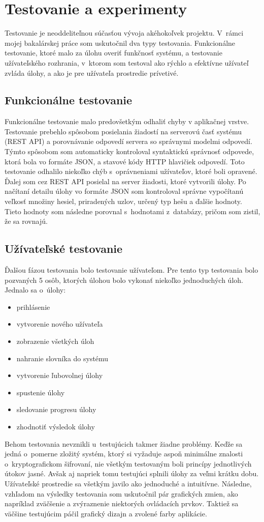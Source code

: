 \documentclass[slovak]{fitthesis}
\begin{document}
\chapter{Testovanie a experimenty}\label{testovanie}
Testovanie je neoddeliteľnou súčasťou vývoja akéhokoľvek projektu. V~rámci mojej bakalárskej práce som uskutočnil dva typy testovania. Funkcionálne testovanie, ktoré malo za úlohu overiť funkčnosť systému, a testovanie užívateľského rozhrania, v~ktorom som testoval ako rýchlo a efektívne užívateľ zvláda úlohy, a ako je pre užívateľa  prostredie prívetivé.

\section{Funkcionálne testovanie}
Funkcionálne testovanie malo predovšetkým odhaliť chyby v aplikačnej vrstve. Testovanie prebehlo spôsobom posielania žiadostí na serverovú časť systému (REST API) a porovnávanie odpovedí servera so správnymi modelmi odpovedí. Týmto spôsobom som automaticky kontroloval syntaktickú správnosť odpovede, ktorá bola vo formáte JSON, a stavové kódy HTTP hlavičiek odpovedí. Toto testovanie odhalilo niekoľko chýb s~oprávneniami užívateľov, ktoré boli opravené. Ďalej som cez REST API posielal na server žiadosti, ktoré vytvorili úlohy. Po načítaní detailu úlohy vo formáte JSON som kontroloval správne vypočítanú veľkosť množiny hesiel, priradených uzlov, určený typ hešu a ďalšie hodnoty. Tieto hodnoty som následne porovnal s~hodnotami z~databázy, pričom som zistil, že sa rovnajú.

\section{Užívateľské testovanie}
Ďalšou fázou testovania bolo testovanie užívateľom. Pre tento typ testovania bolo pozvaných 5 osôb, ktorých úlohou bolo vykonať niekoľko jednoduchých úloh. Jednalo sa o~úlohy:
\begin{itemize}
    \item prihlásenie
    \item vytvorenie nového užívateľa
    \item zobrazenie všetkých úloh
    \item nahranie slovníka do systému
    \item vytvorenie ľubovolnej úlohy
    \item spustenie úlohy
    \item sledovanie progresu úlohy
    \item zhodnotiť výsledok úlohy
\end{itemize}
Behom testovania nevznikli u~testujúcich takmer žiadne problémy. Keďže sa jedná o~pomerne zložitý systém, ktorý si vyžaduje aspoň minimálne znalosti o~kryptografickom šifrovaní, nie všetkým testovaným boli princípy jednotlivých útokov jasné. Avšak aj napriek tomu testujúci splnili úlohy za veľmi krátku dobu. Užívateľské prostredie sa všetkým javilo ako jednoduché a intuitívne. Následne, vzhľadom na výsledky testovania som uskutočnil pár grafických zmien, ako napríklad zväčšenie a zvýraznenie niektorých ovládacích prvkov. Taktiež sa väčšine testujúcim páčil grafický dizajn a zvolené farby aplikácie.  
\end{document}
